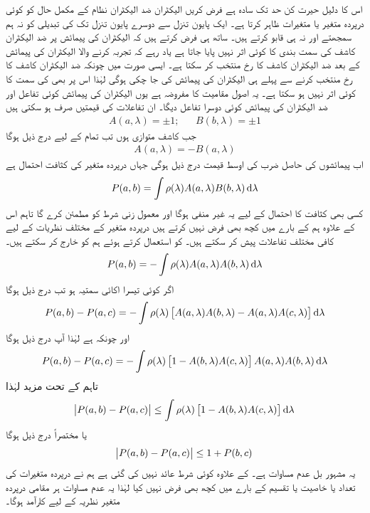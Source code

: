 اس کا دلیل حیرت کن حد تک سادہ ہے فرض کریں الیکٹران ضد الیکٹران نظام کے مکمل حال کو کوئی درپردہ متغیر یا متغیرات  ظاہر کرتا ہے۔ ایک پایون تنزل سے دوسرے پایون تنزل تک  کی تبدیلی کو نہ ہم سمجھتے اور نہ ہی قابو کرتے ہیں۔ ساتھ ہی فرض کرتے ہیں کہ الیکٹران کی پیمائش پر ضد الیکٹران کاشف کی سمت بندی  کا کوئی اثر نہیں پایا جاتا ہے یاد رہے کہ تجربہ کرنے والا الیکٹران کی پیمائش کے بعد ضد الیکٹران کاشف کا رخ منتخب کر سکتا ہے۔ ایسی صورت میں چونکہ ضد الیکٹران کاشف کا رخ منتخب کرنے سے پہلے ہی الیکٹران کی پیمائش کی جا چکی ہوگی لہٰذا اس پر بھی کی سمت کا کوئی اثر نہیں ہو سکتا ہے۔ یہ اصول مقامیت کا مفروضہ ہے یوں الیکٹران کی پیمائش کوئی تفاعل  اور ضد الیکٹران کی پیمائش کوئی دوسرا تفاعل  دیگا۔ ان تفاعلات کی قیمتیں صرف  ہو سکتی ہیں
\begin{align}
	A(a, \lambda) = \pm1; && B(b, \lambda) = \pm1
\end{align}
جب کاشف متوازی ہوں تب تمام  کے لیے درج ذیل ہوگا 
\begin{align}
	A(a, \lambda) = -B(a, \lambda)
\end{align}
اب پیمائشوں کی حاصل ضرب کی اوسط قیمت درج ذیل ہوگی جہاں  درپردہ متغیر کی کثافت احتمال ہے
\begin{align}
	P(a, b) = \int\rho(\lambda)A(a, \lambda)B(b, \lambda)\dif\lambda
\end{align}
کسی بھی کثافت کا احتمال کے لیے یہ غیر منفی ہوگا اور معمول زنی شرط  کو مطمئن کرے گا تاہم اس کے علاوہ ہم  کے بارے میں کچھ بھی فرض نہیں کرتے ہیں درپردہ متغیر کے مختلف نظریات  کے لیے کافی مختلف تفاعلات پیش کر سکتے ہیں۔  کو استعمال کرتے ہوئے ہم  کو خارج کر سکتے ہیں۔
\begin{align}
	P(a, b) = -\int\rho(\lambda)A(a, \lambda)A(b, \lambda)\dif\lambda
\end{align}
اگر  کوئی تیسرا اکائی سمتیہ ہو تب درج ذیل ہوگا
\begin{align}
	P(a, b)-P(a, c) = -\int\rho(\lambda)\left[A(a, \lambda)A(b, \lambda)-A(a, \lambda)A(c, \lambda)\right]\dif\lambda
\end{align}
اور چونکہ  ہے لہٰذا   آپ درج ذیل ہوگا 
\begin{align}
	P(a, b)-P(a, c) =-\int\rho(\lambda)\left[1-A(b, \lambda)A(c, \lambda)\right]A(a, \lambda)A(b, \lambda)\dif\lambda
\end{align}
تاہم  کے تحت  مزید  لہٰذا 
\begin{align}
	\abs{P(a, b)-P(a,c)}\leq\int\rho(\lambda)\left[1-A(b, \lambda)A(c, \lambda)\right]\dif\lambda
\end{align}
یا مختصراً درج ذیل ہوگا
\begin{align}
	\abs{P(a, b)-P(a, c)}\leq1+P(b, c)
\end{align}
یہ مشہور بل عدم مساوات ہے۔  کے علاوہ کوئی شرط عائد نہیں کی گئی ہے ہم نے درپردہ متغیرات کی تعداد یا خاصیت یا تقسیم  کے بارے میں کچھ بھی فرض نہیں کیا لہٰذا یہ عدم مساوات ہر مقامی درپردہ متغیر نظریہ کے لیے کارآمد ہوگا۔


